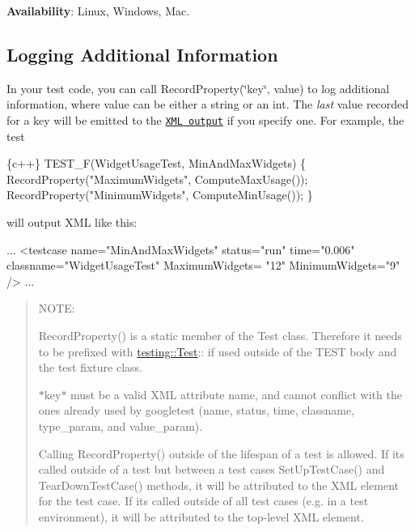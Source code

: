 {\bfseries Availability}\+: Linux, Windows, Mac.

\subsection*{Logging Additional Information}

In your test code, you can call {\ttfamily Record\+Property(\char`\"{}key\char`\"{}, value)} to log additional information, where {\ttfamily value} can be either a string or an {\ttfamily int}. The {\itshape last} value recorded for a key will be emitted to the \href{#generating-an-xml-report}{\tt X\+ML output} if you specify one. For example, the test


\begin{DoxyCode}
\{c++\}
TEST\_F(WidgetUsageTest, MinAndMaxWidgets) \{
  RecordProperty("MaximumWidgets", ComputeMaxUsage());
  RecordProperty("MinimumWidgets", ComputeMinUsage());
\}
\end{DoxyCode}


will output X\+ML like this\+:


\begin{DoxyCode}
...
  <\textcolor{keywordtype}{testcase} \textcolor{keyword}{name}=\textcolor{stringliteral}{"MinAndMaxWidgets"} \textcolor{keyword}{status}=\textcolor{stringliteral}{"run"} \textcolor{keyword}{time}=\textcolor{stringliteral}{"0.006"} \textcolor{keyword}{classname}=\textcolor{stringliteral}{"WidgetUsageTest"} \textcolor{keyword}{MaximumWidgets}=\textcolor{stringliteral}{
      "12"} \textcolor{keyword}{MinimumWidgets}=\textcolor{stringliteral}{"9"} />
...
\end{DoxyCode}


\begin{quote}
N\+O\+TE\+:


\begin{DoxyItemize}
\item {\ttfamily Record\+Property()} is a static member of the {\ttfamily Test} class. Therefore it needs to be prefixed with {\ttfamily \hyperlink{classtesting_1_1Test}{testing\+::\+Test}\+:\+:} if used outside of the {\ttfamily T\+E\+ST} body and the test fixture class.
\item {\ttfamily $\ast$key$\ast$} must be a valid X\+ML attribute name, and cannot conflict with the ones already used by googletest ({\ttfamily name}, {\ttfamily status}, {\ttfamily time}, {\ttfamily classname}, {\ttfamily type\+\_\+param}, and {\ttfamily value\+\_\+param}).
\item Calling {\ttfamily Record\+Property()} outside of the lifespan of a test is allowed. If it\textquotesingle{}s called outside of a test but between a test case\textquotesingle{}s {\ttfamily Set\+Up\+Test\+Case()} and {\ttfamily Tear\+Down\+Test\+Case()} methods, it will be attributed to the X\+ML element for the test case. If it\textquotesingle{}s called outside of all test cases (e.\+g. in a test environment), it will be attributed to the top-\/level X\+ML element. 
\end{DoxyItemize}\end{quote}


